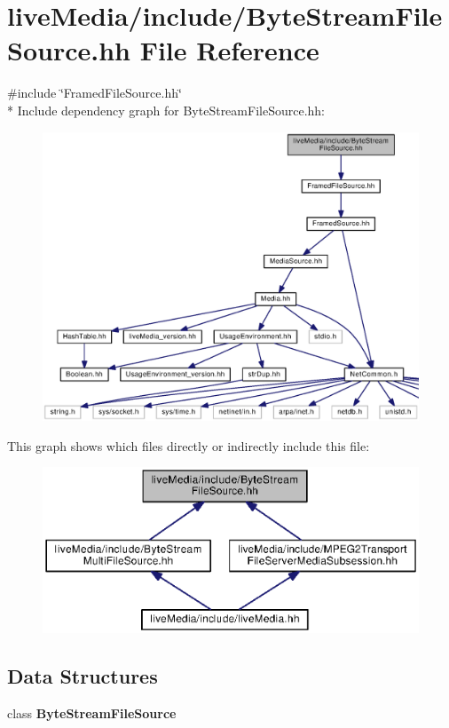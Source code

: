 \section{live\+Media/include/\+Byte\+Stream\+File\+Source.hh File Reference}
\label{ByteStreamFileSource_8hh}
{\ttfamily \#include \char`\"{}Framed\+File\+Source.\+hh\char`\"{}}\\*
Include dependency graph for Byte\+Stream\+File\+Source.\+hh\+:
\nopagebreak
\begin{figure}[H]
\begin{center}
\leavevmode
\includegraphics[width=350pt]{ByteStreamFileSource_8hh__incl}
\end{center}
\end{figure}
This graph shows which files directly or indirectly include this file\+:
\nopagebreak
\begin{figure}[H]
\begin{center}
\leavevmode
\includegraphics[width=350pt]{ByteStreamFileSource_8hh__dep__incl}
\end{center}
\end{figure}
\subsection*{Data Structures}
\begin{DoxyCompactItemize}
\item 
class {\bf Byte\+Stream\+File\+Source}
\end{DoxyCompactItemize}
